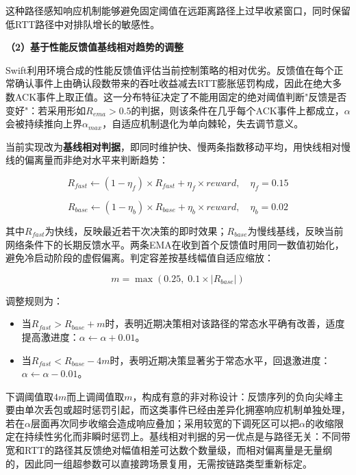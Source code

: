 这种路径感知响应机制能够避免固定阈值在远距离路径上过早收紧窗口，同时保留低RTT路径中对排队增长的敏感性。

\textbf{（2）基于性能反馈值基线相对趋势的调整}

Swift利用环境合成的性能反馈值评估当前控制策略的相对优劣。反馈值在每个正常确认事件上由确认段数带来的吞吐收益减去RTT膨胀惩罚构成，因此在绝大多数ACK事件上取正值。这一分布特征决定了不能用固定的绝对阈值判断"反馈是否变好"：若采用形如$R_{ema} > 0.5$的判据，则该条件在几乎每个ACK事件上都成立，$\alpha$会被持续推向上界$\alpha_{max}$，自适应机制退化为单向棘轮，失去调节意义。

当前实现改为\textbf{基线相对判据}，即同时维护快、慢两条指数移动平均，用快线相对慢线的偏离量而非绝对水平来判断趋势：

\begin{equation}
R_{fast} \leftarrow (1 - \eta_f) \times R_{fast} + \eta_f \times reward, \quad \eta_f = 0.15
\end{equation}

\begin{equation}
R_{base} \leftarrow (1 - \eta_b) \times R_{base} + \eta_b \times reward, \quad \eta_b = 0.02
\end{equation}

其中$R_{fast}$为快线，反映最近若干次决策的即时效果；$R_{base}$为慢线基线，反映当前网络条件下的长期反馈水平。两条EMA在收到首个反馈值时用同一数值初始化，避免冷启动阶段的虚假偏离。判定容差按基线幅值自适应缩放：

\begin{equation}
m = \max(0.25,\; 0.1 \times |R_{base}|)
\end{equation}

调整规则为：
\begin{itemize}
    \item 当$R_{fast} > R_{base} + m$时，表明近期决策相对该路径的常态水平确有改善，适度提高激进度：$\alpha \leftarrow \alpha + 0.01$。
    \item 当$R_{fast} < R_{base} - 4m$时，表明近期决策显著劣于常态水平，回退激进度：$\alpha \leftarrow \alpha - 0.01$。
\end{itemize}

下调阈值取$4m$而上调阈值取$m$，构成有意的非对称设计：反馈序列的负向尖峰主要由单次丢包或超时惩罚引起，而这类事件已经由差异化拥塞响应机制单独处理，若在$\alpha$层面再次同步收缩会造成响应叠加；采用较宽的下调死区可以把$\alpha$的收缩限定在持续性劣化而非瞬时惩罚上。基线相对判据的另一优点是与路径无关：不同带宽和RTT的路径其反馈绝对幅值相差可达数个数量级，而相对偏离量是无量纲的，因此同一组超参数可以直接跨场景复用，无需按链路类型重新标定。

